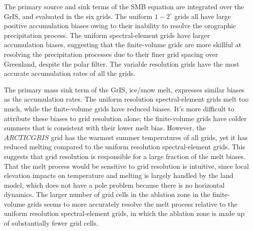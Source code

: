 \documentclass[draft]{agujournal2019}
\begin{document}
The primary source and sink terms of the SMB equation are integrated over the GrIS, and evaluated in the six grids. The uniform $1-2^{\circ}$ grids all have large positive accumulation biases owing to their inability to resolve the orographic precipitation process. The uniform spectral-element grids have larger accumulation biases, suggesting that the finite-volume grids are more skillful at resolving the precipitation processes due to their finer grid spacing over Greenland, despite the polar filter. The variable resolution grids have the most accurate accumulation rates of all the grids. 

The primary mass sink term of the GrIS, ice/snow melt, expresses similar biases as the accumulation rates. The uniform resolution spectral-element grids melt too much, while the finite-volume grids have reduced biases. It's more difficult to attribute these biases to grid resolution alone; the finite-volume grids have colder summers that is consistent with their lower melt bias. However, the $ARCTICGRIS$ grid has the warmest summer temperatures of all grids, yet it has reduced melting compared to the uniform resolution spectral-element grids. This suggests that grid resolution is responsible for a large fraction of the melt biases. That the melt process would be sensitive to grid resolution is intuitive, since local elevation impacts on temperature and melting is largely handled by the land model, which does not have a pole problem because there is no horizontal dynamics. The larger number of grid cells in the ablation zone in the finite-volume grids seems to more accurately resolve the melt process relative to the uniform resolution spectral-element grids, in which the ablation zone is made up of substantially fewer grid cells.



%
%
%
%
\end{document}
